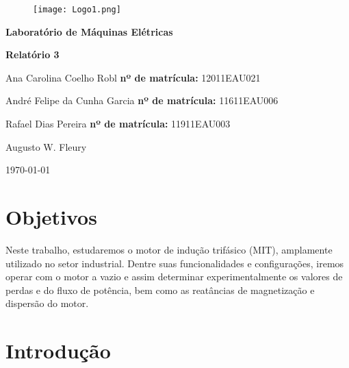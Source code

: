 \documentclass[a4paper,12pt,oneside]{article}
\begin{document}
\thispagestyle{empty}

\begin{center}
\begin{figure}\centering
\texttt{[image: Logo1.png]}
\end{figure}\*


\vspace{5cm}

{\Large\bfseries 
Laboratório de Máquinas Elétricas}

\vspace{0.5cm}

{\Large\bfseries 
Relatório 3}
\end{center}

\vspace{8cm}

 Ana Carolina Coelho Robl \hfill {\bfseries nº de matrícula:} 12011EAU021

 André Felipe da Cunha Garcia \hfill {\bfseries nº de matrícula:} 11611EAU006

 Rafael Dias Pereira \hfill {\bfseries nº de matrícula:} 11911EAU003

 Augusto W. Fleury

\vfill
\begin{center}
\large \today
\end{center}



\newpage
\tableofcontents\newpage
{}

\section{Objetivos}\hspace{0pt}

Neste trabalho, estudaremos o motor de indução trifásico (MIT), amplamente utilizado no setor industrial. Dentre suas funcionalidades e configurações, iremos operar com o motor a vazio e assim determinar experimentalmente os valores de perdas e do fluxo de potência, bem como as reatâncias de magnetização e dispersão do motor.

\newpage
\section{Introdução}\hspace{0pt}
\end{document}
